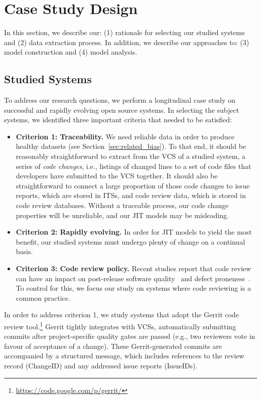 \section{Case Study Design}
\label{sec:design}

In this section, we describe our: (1) rationale for selecting our studied systems and (2) data extraction process. In addition, we describe our approaches to: (3) model construction and (4) model analysis.

\subsection{Studied Systems}
\label{sec:studied}

To address our research questions, we perform a longitudinal case study on successful and rapidly evolving open source systems.
In selecting the subject systems, we identified three important criteria that needed to be satisfied:

\begin{itemize}
  \item {\bf Criterion 1: Traceability.}
    We need reliable data in order to produce healthy datasets (see Section~\ref{sec:related_bias}).
    To that end, it should be reasonably straightforward to extract from the VCS of a studied system, a series of {\em code changes}, i.e., listings of changed lines to a set of code files that developers have submitted to the VCS together.
    It should also be straightforward to connect a large proportion of those code changes to issue reports, which are stored in ITSs, and code review data, which is stored in code review databases.
    Without a traceable process, our code change properties will be unreliable, and our JIT models may be misleading.
  \item {\bf Criterion 2: Rapidly evolving.}
    In order for JIT models to yield the most benefit, our studied systems must undergo plenty of change on a continual basis.
  \item {\bf Criterion 3: Code review policy.}
    Recent studies report that code review can have an impact on post-release software quality~\cite{mcintosh2016emse,thongtanunam2015msr} and defect proneness~\cite{kononenko2015icsme}.
    To control for this, we focus our study on systems where code reviewing is a common practice.
\end{itemize}

In order to address criterion 1, we study systems that adopt the Gerrit code review tool.\footnote{\url{https://code.google.com/p/gerrit/}}
Gerrit tightly integrates with VCSs, automatically submitting commits after project-specific quality gates are passed (e.g., two reviewers vote in favour of acceptance of a change).
These Gerrit-generated commits are accompanied by a structured message, which includes references to the review record (ChangeID) and any addressed issue reports (IssueIDs).

